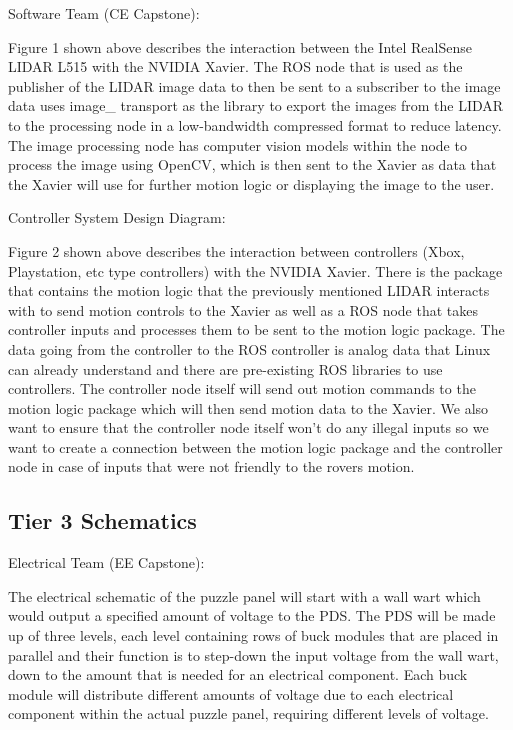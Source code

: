 \documentclass[a4paper, 10pt]{article}
\begin{document}
	
Software Team (CE Capstone):

Figure 1 shown above describes the interaction between the Intel RealSense LIDAR L515 with the NVIDIA Xavier. The ROS node that is used as the publisher of the LIDAR image data to then be sent to a subscriber to the image data uses image\_ transport as the library to export the images from the LIDAR to the processing node in a low-bandwidth compressed format to reduce latency. The image processing node has computer vision models within the node to process the image using OpenCV, which is then sent to the Xavier as data that the Xavier will use for further motion logic or displaying the image to the user.

Controller System Design Diagram:

Figure 2 shown above describes the interaction between controllers (Xbox, Playstation, etc type controllers) with the NVIDIA Xavier. There is the package that contains the motion logic that the previously mentioned LIDAR interacts with to send motion controls to the Xavier as well as a ROS node that takes controller inputs and processes them to be sent to the motion logic package. The data going from the controller to the ROS controller is analog data that Linux can already understand and there are pre-existing ROS libraries to use controllers. The controller node itself will send out motion commands to the motion logic package which will then send motion data to the Xavier. We also want to ensure that the controller node itself won't do any illegal inputs so we want to create a connection between the motion logic package and the controller node in case of inputs that were not friendly to the rovers motion.	
	
	\subsection{Tier 3 Schematics}
	Electrical Team (EE Capstone):
	
The electrical schematic of the puzzle panel will start with a wall wart which would output a specified amount of voltage to the PDS. The PDS will be made up of three levels, each level containing rows of buck modules that are placed in parallel and their function is to step-down the input voltage from the wall wart, down to the amount that is needed for an electrical component. Each buck module will distribute different amounts of voltage due to each electrical component within the actual puzzle panel, requiring different levels of voltage.
\end{document}

